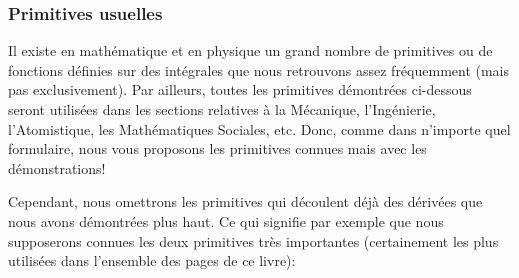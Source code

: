 	\pagebreak
	\subsubsection{Primitives usuelles}\label{usual primitives}
	Il existe en mathématique et en physique un grand nombre de primitives ou de fonctions définies sur des intégrales que nous retrouvons assez fréquemment (mais pas exclusivement). Par ailleurs, toutes les primitives démontrées ci-dessous seront utilisées dans les sections relatives à la Mécanique, l'Ingénierie, l'Atomistique, les Mathématiques Sociales, etc. Donc, comme dans n'importe quel formulaire, nous vous proposons les primitives connues mais avec les démonstrations! 

	Cependant, nous omettrons les primitives qui découlent déjà des dérivées que nous avons démontrées plus haut. Ce qui signifie par exemple que nous supposerons connues les deux primitives très importantes (certainement les plus utilisées dans l'ensemble des pages de ce livre): 
		
